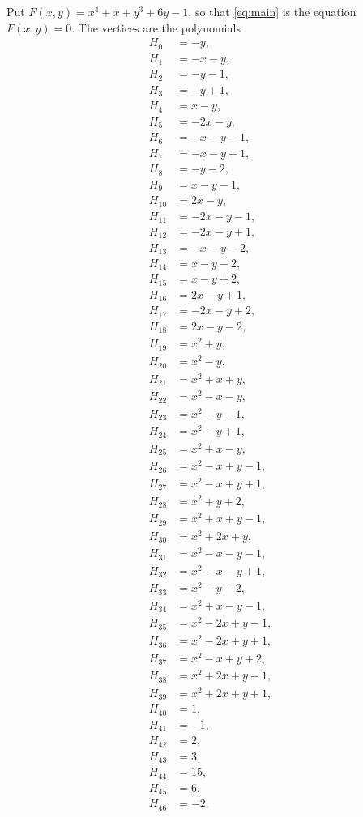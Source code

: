 \documentclass[11pt]{article}
\begin{document}
Put $F(x,y)=x^{4}+x+y^{3}+6y-1$, so that \eqref{eq:main} is the equation $F(x,y)=0$. The vertices are the polynomials
\begin{align*}
H_{0}&=-y,\\
H_{1}&=-x-y,\\
H_{2}&=-y-1,\\
H_{3}&=-y+1,\\
H_{4}&=x-y,\\
H_{5}&=-2x-y,\\
H_{6}&=-x-y-1,\\
H_{7}&=-x-y+1,\\
H_{8}&=-y-2,\\
H_{9}&=x-y-1,\\
H_{10}&=2x-y,\\
H_{11}&=-2x-y-1,\\
H_{12}&=-2x-y+1,\\
H_{13}&=-x-y-2,\\
H_{14}&=x-y-2,\\
H_{15}&=x-y+2,\\
H_{16}&=2x-y+1,\\
H_{17}&=-2x-y+2,\\
H_{18}&=2x-y-2,\\
H_{19}&=x^{2}+y,\\
H_{20}&=x^{2}-y,\\
H_{21}&=x^{2}+x+y,\\
H_{22}&=x^{2}-x-y,\\
H_{23}&=x^{2}-y-1,\\
H_{24}&=x^{2}-y+1,\\
H_{25}&=x^{2}+x-y,\\
H_{26}&=x^{2}-x+y-1,\\
H_{27}&=x^{2}-x+y+1,\\
H_{28}&=x^{2}+y+2,\\
H_{29}&=x^{2}+x+y-1,\\
H_{30}&=x^{2}+2x+y,\\
H_{31}&=x^{2}-x-y-1,\\
H_{32}&=x^{2}-x-y+1,\\
H_{33}&=x^{2}-y-2,\\
H_{34}&=x^{2}+x-y-1,\\
H_{35}&=x^{2}-2x+y-1,\\
H_{36}&=x^{2}-2x+y+1,\\
H_{37}&=x^{2}-x+y+2,\\
H_{38}&=x^{2}+2x+y-1,\\
H_{39}&=x^{2}+2x+y+1,\\
H_{40}&=1,\\
H_{41}&=-1,\\
H_{42}&=2,\\
H_{43}&=3,\\
H_{44}&=15,\\
H_{45}&=6,\\
H_{46}&=-2.
\end{align*}
\end{document}
